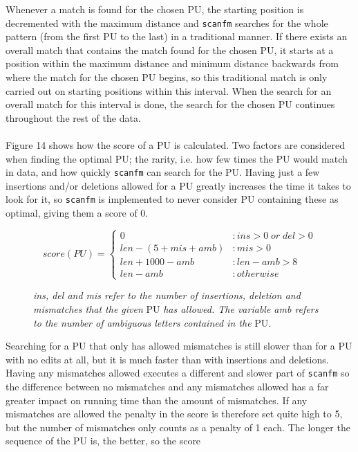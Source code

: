 \documentclass[12pt]{article}
\newcommand{\sfm}{\texttt{scanfm} }
\newcommand{\pu}{PU }
\newcommand{\pup}{PU. }
\begin{document}
Whenever a match is found for the chosen PU, the starting position is decremented with the maximum distance and 
\sfm searches for the whole pattern (from the first \pu to the last) in a traditional manner. If there exists an overall
match that contains the match found for the chosen PU, it starts at a position within the maximum distance and 
minimum distance backwards from where the match for the chosen \pu begins, so this traditional match is only carried
out on starting positions within this interval. When the search for an overall match for this interval is done,
the search for the chosen \pu continues throughout the rest of the data. \\ \\
Figure 14 shows how the score of a \pu is calculated. Two factors are considered when finding the optimal PU;
the rarity, i.e. how few times the \pu would match in data, and how quickly \sfm can search for the \pup
Having just a few insertions and/or deletions allowed for a \pu greatly increases the time it takes to look for it,
so \sfm is implemented to never consider \pu containing these as optimal, giving them a score of 0.
\begin{figure}[H]
\begin{displaymath}
   score(PU) = \left\{
     \begin{array}{ll}
       0 & : ins > 0\;or\;del > 0\\
       len-(5+mis+amb) & : mis>0 \\
       len+1000-amb & : len-amb>8 \\
       len-amb & : otherwise
     \end{array}
   \right.
\end{displaymath}
\caption{\textit{ins, del and mis refer to the number of insertions, deletion and mismatches that the given} \pu
\textit{has allowed. The variable amb refers to the number of ambiguous letters contained in the} \pup} 
\end{figure}
\noindent Searching for a \pu that only has allowed mismatches is still slower than for a \pu 
with no edits at all, but it is much
faster than with insertions and deletions. Having any mismatches allowed executes a different and slower part of \sfm
so the difference between no mismatches and any mismatches allowed has a far greater impact on running time than the amount of
mismatches. If any mismatches are allowed the penalty in the score is therefore set quite high to 5, but the number of 
mismatches only counts as a penalty of 1 each. The longer the sequence of the \pu is, the better, so the score
\end{document}
